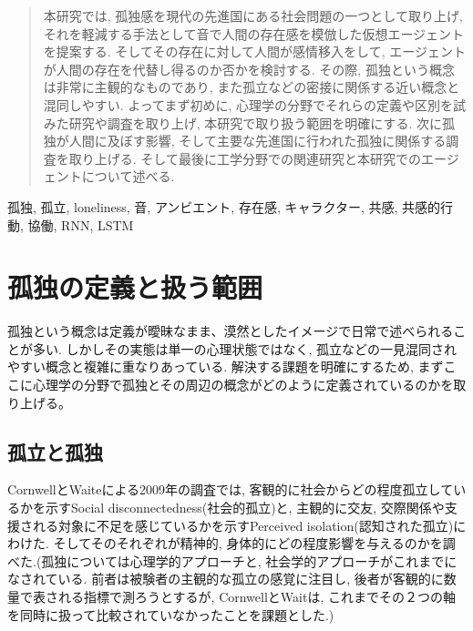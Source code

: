 \documentclass[a4paper,dvipdfmx]{hisken}
\begin{document}

\begin{abstract}
本研究では, 孤独感を現代の先進国にある社会問題の一つとして取り上げ, それを軽減する手法として音で人間の存在感を模倣した仮想エージェントを提案する. そしてその存在に対して人間が感情移入をして, エージェントが人間の存在を代替し得るのか否かを検討する. その際, 孤独という概念は非常に主観的なものであり, また孤立などの密接に関係する近い概念と混同しやすい. よってまず初めに, 心理学の分野でそれらの定義や区別を試みた研究や調査を取り上げ, 本研究で取り扱う範囲を明確にする. 次に孤独が人間に及ぼす影響, そして主要な先進国に行われた孤独に関係する調査を取り上げる. そして最後に工学分野での関連研究と本研究でのエージェントについて述べる.
\end{abstract}

\begin{keyword}	
孤独, 孤立, loneliness, 音, アンビエント, 存在感, キャラクター, 共感, 共感的行動, 協働, RNN, LSTM
\end{keyword}

\maketitle
	
\section{孤独の定義と扱う範囲}
孤独という概念は定義が曖昧なまま、漠然としたイメージで日常で述べられることが多い. しかしその実態は単一の心理状態ではなく, 孤立などの一見混同されやすい概念と複雑に重なりあっている. 解決する課題を明確にするため, まずここに心理学の分野で孤独とその周辺の概念がどのように定義されているのかを取り上げる。
\subsection{孤立と孤独}

CornwellとWaiteによる2009年の調査では, 客観的に社会からどの程度孤立しているかを示すSocial disconnectedness(社会的孤立)と, 主観的に交友, 交際関係や支援される対象に不足を感じているかを示すPerceived isolation(認知された孤立)にわけた{}\cite{tex1}. そしてそのそれぞれが精神的, 身体的にどの程度影響を与えるのかを調べた.(孤独については心理学的アプローチと, 社会学的アプローチがこれまでになされている. 前者は被験者の主観的な孤立の感覚に注目し, 後者が客観的に数量で表される指標で測ろうとするが, CornwellとWaitは, これまでその２つの軸を同時に扱って比較されていなかったことを課題とした.)
\end{document}
